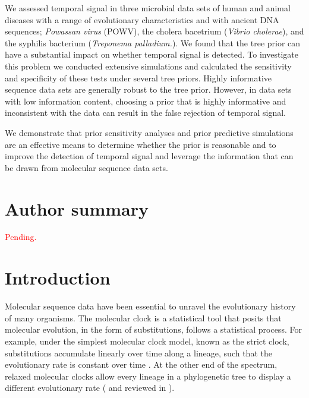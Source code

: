 \documentclass[10pt,letterpaper]{article}
\begin{document}
We assessed temporal signal in three microbial data sets of human and animal diseases with a range of evolutionary characteristics and with ancient DNA sequences; \textit{Powassan virus} (POWV), the cholera bacetrium (\textit{Vibrio cholerae}), and the syphilis bacterium (\textit{Treponema palladium.}). We found that the tree prior can have a substantial impact on whether temporal signal is detected. To investigate this problem we conducted extensive simulations and calculated the sensitivity and specificity of these tests under several tree priors.  Highly informative sequence data sets are generally robust to the tree prior. However, in data sets with low information content, choosing a prior that is highly informative and inconsistent with the data can result in the false rejection of temporal signal. 

We demonstrate that prior sensitivity analyses and prior predictive simulations are an effective means to determine whether the prior is reasonable and to improve the detection of temporal signal and leverage the information that can be drawn from molecular sequence data sets.


\section*{Author summary}
\textcolor{red}{Pending.}
\linenumbers

\section*{Introduction}
Molecular sequence data have been essential to unravel the evolutionary history of many organisms. The molecular clock is a statistical tool that posits that molecular evolution, in the form of substitutions, follows a statistical process. For example, under the simplest molecular clock model, known as the strict clock, substitutions accumulate linearly over time along a lineage, such that the evolutionary rate is constant over time \cite{zuckerkandl1965evolutionary}. At the other end of the spectrum, relaxed molecular clocks allow every lineage in a phylogenetic tree to display a different evolutionary rate (\cite{drummond2006relaxed} and reviewed in \cite{ho2014molecular}). 
\end{document}
